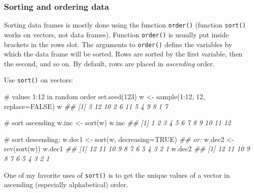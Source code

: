 \documentclass[
  13,
  letterpaper,
]{report}
\newenvironment{Shaded}{\begin{snugshade}}{\end{snugshade}}
\newcommand{\AttributeTok}[1]{\textcolor[rgb]{0.40,0.45,0.13}{#1}}
\newcommand{\CommentTok}[1]{\textcolor[rgb]{0.37,0.37,0.37}{#1}}
\newcommand{\ConstantTok}[1]{\textcolor[rgb]{0.56,0.35,0.01}{#1}}
\newcommand{\DecValTok}[1]{\textcolor[rgb]{0.68,0.00,0.00}{#1}}
\newcommand{\DocumentationTok}[1]{\textcolor[rgb]{0.37,0.37,0.37}{\textit{#1}}}
\newcommand{\FunctionTok}[1]{\textcolor[rgb]{0.28,0.35,0.67}{#1}}
\newcommand{\NormalTok}[1]{\textcolor[rgb]{0.00,0.23,0.31}{#1}}
\newcommand{\OtherTok}[1]{\textcolor[rgb]{0.00,0.23,0.31}{#1}}
\newcommand{\SpecialCharTok}[1]{\textcolor[rgb]{0.37,0.37,0.37}{#1}}
\begin{document}
\subsubsection{Sorting and ordering data}\label{sec-manip-df-com-sort}

Sorting data frames is mostly done using the function \texttt{order()}
(function \texttt{sort()} works on vectors, not data frames). Function
\texttt{order()} is usually put inside brackets in the rows slot. The
arguments to \texttt{order()} define the variables by which the data
frame will be sorted. Rows are sorted by the first variable, then the
second, and so on. By default, rows are placed in \emph{ascending}
order.

Use \texttt{sort()} on vectors:

\begin{Shaded}
\begin{Highlighting}[]
\CommentTok{\# values 1:12 in random order}
\FunctionTok{set.seed}\NormalTok{(}\DecValTok{123}\NormalTok{)}
\NormalTok{w }\OtherTok{\textless{}{-}} \FunctionTok{sample}\NormalTok{(}\DecValTok{1}\SpecialCharTok{:}\DecValTok{12}\NormalTok{, }\DecValTok{12}\NormalTok{, }\AttributeTok{replace=}\ConstantTok{FALSE}\NormalTok{)}
\NormalTok{w}
\DocumentationTok{\#\#  [1]  3 12 10  2  6 11  5  4  9  8  1  7}

\CommentTok{\# sort ascending}
\NormalTok{w.inc }\OtherTok{\textless{}{-}} \FunctionTok{sort}\NormalTok{(w)}
\NormalTok{w.inc}
\DocumentationTok{\#\#  [1]  1  2  3  4  5  6  7  8  9 10 11 12}

\CommentTok{\# sort descending:}
\NormalTok{w.dec1 }\OtherTok{\textless{}{-}} \FunctionTok{sort}\NormalTok{(w, }\AttributeTok{decreasing=}\ConstantTok{TRUE}\NormalTok{)}
\DocumentationTok{\#\# or:}
\NormalTok{w.dec2 }\OtherTok{\textless{}{-}} \FunctionTok{rev}\NormalTok{(}\FunctionTok{sort}\NormalTok{(w))}
\NormalTok{w.dec1}
\DocumentationTok{\#\#  [1] 12 11 10  9  8  7  6  5  4  3  2  1}
\NormalTok{w.dec2}
\DocumentationTok{\#\#  [1] 12 11 10  9  8  7  6  5  4  3  2  1}
\end{Highlighting}
\end{Shaded}

One of my favorite uses of \texttt{sort()} is to get the unique values
of a vector in ascending (especially alphabetical) order.
\end{document}

